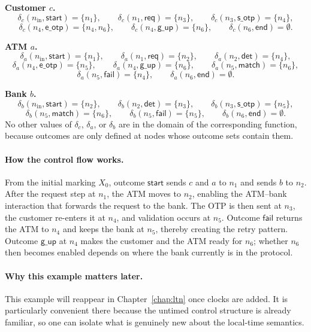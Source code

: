 \medskip
\noindent\textbf{Customer $c$.}
\[
\delta_c(n_{\mathrm{in}},\mathsf{start})=\{n_1\}, \qquad
\delta_c(n_1,\mathsf{req})=\{n_3\}, \qquad
\delta_c(n_3,\mathsf{s\_otp})=\{n_4\},
\]
\[
\delta_c(n_4,\mathsf{e\_otp})=\{n_4,n_6\}, \qquad
\delta_c(n_4,\mathsf{g\_up})=\{n_6\}, \qquad
\delta_c(n_6,\mathsf{end})=\emptyset.
\]

\noindent\textbf{ATM $a$.}
\[
\delta_a(n_{\mathrm{in}},\mathsf{start})=\{n_1\}, \qquad
\delta_a(n_1,\mathsf{req})=\{n_2\}, \qquad
\delta_a(n_2,\mathsf{det})=\{n_4\},
\]
\[
\delta_a(n_4,\mathsf{e\_otp})=\{n_5\}, \qquad
\delta_a(n_4,\mathsf{g\_up})=\{n_6\}, \qquad
\delta_a(n_5,\mathsf{match})=\{n_6\},
\]
\[
\delta_a(n_5,\mathsf{fail})=\{n_4\}, \qquad
\delta_a(n_6,\mathsf{end})=\emptyset.
\]

\noindent\textbf{Bank $b$.}
\[
\delta_b(n_{\mathrm{in}},\mathsf{start})=\{n_2\}, \qquad
\delta_b(n_2,\mathsf{det})=\{n_3\}, \qquad
\delta_b(n_3,\mathsf{s\_otp})=\{n_5\},
\]
\[
\delta_b(n_5,\mathsf{match})=\{n_6\}, \qquad
\delta_b(n_5,\mathsf{fail})=\{n_5\}, \qquad
\delta_b(n_6,\mathsf{end})=\emptyset.
\]
No other values of $\delta_c$, $\delta_a$, or $\delta_b$ are in the domain of the corresponding function, because outcomes are only defined at nodes whose outcome sets contain them.

\paragraph{How the control flow works.}
From the initial marking $X_0$, outcome $\mathsf{start}$ sends $c$ and $a$ to $n_1$ and sends $b$ to $n_2$. After the request step at $n_1$, the ATM moves to $n_2$, enabling the ATM--bank interaction that forwards the request to the bank. The OTP is then sent at $n_3$, the customer re-enters it at $n_4$, and validation occurs at $n_5$. Outcome $\mathsf{fail}$ returns the ATM to $n_4$ and keeps the bank at $n_5$, thereby creating the retry pattern. Outcome $\mathsf{g\_up}$ at $n_4$ makes the customer and the ATM ready for $n_6$; whether $n_6$ then becomes enabled depends on where the bank currently is in the protocol.

\paragraph{Why this example matters later.}
This example will reappear in Chapter~\ref{chap:ltn} once clocks are added. It is particularly convenient there because the untimed control structure is already familiar, so one can isolate what is genuinely new about the local-time semantics.

